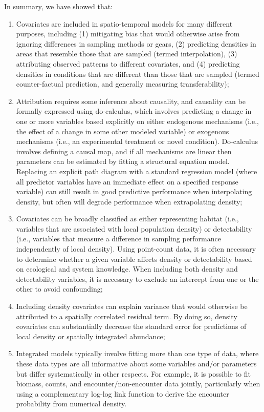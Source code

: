 In summary, we have showed that:
\begin{enumerate}
    \item Covariates are included in spatio-temporal models for many different purposes, including (1) mitigating bias that would otherwise arise from ignoring differences in sampling methods or gears, (2) predicting densities in areas that resemble those that are sampled (termed interpolation), (3) attributing observed patterns to different covariates, and (4) predicting densities in conditions that are different than those that are sampled (termed counter-factual prediction, and generally measuring transferability);  

   \item Attribution requires some inference about causality, and causality can be formally expressed using do-calculus, which involves predicting a change in one or more variables based explicitly on either endogenous mechanisms (i.e., the effect of a change in some other modeled variable) or exogenous mechanisms (i.e., an experimental treatment or novel condition).  Do-calculus involves defining a causal map, and if all mechanisms are linear then parameters can be estimated by fitting a structural equation model.  Replacing an explicit path diagram with a standard regression model (where all predictor variables have an immediate effect on a specified response variable) can still result in good predictive performance when interpolating density, but often will degrade performance when extrapolating density;

   \item Covariates can be broadly classified as either representing habitat (i.e., variables that are associated with local population density) or detectability (i.e., variables that measure a difference in sampling performance independently of local density).  Using point-count data, it is often necessary to determine whether a given variable affects density or detectability based on ecological and system knowledge.  When including both density and detectability variables, it is necessary to exclude an intercept from one or the other to avoid confounding;  

   \item Including density covariates can explain variance that would otherwise be attributed to a spatially correlated residual term.  By doing so, density covariates can substantially decrease the standard error for predictions of local density or spatially integrated abundance;  

   \item Integrated models typically involve fitting more than one type of data, where these data types are all informative about some variables and/or parameters but differ systematically in other respects.  For example, it is possible to fit biomass, counts, and encounter/non-encounter data jointly, particularly when using a complementary log-log link function to derive the encounter probability from numerical density.  
\end{enumerate}

